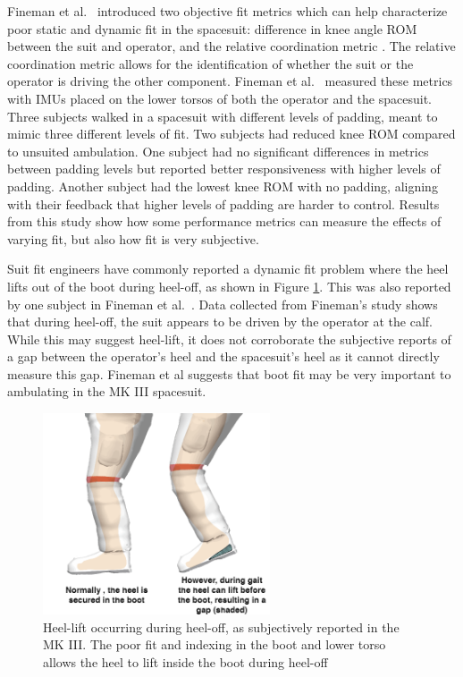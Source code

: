 \documentclass[defaultstyle,11pt]{comps}
\begin{document}
Fineman et al.~\citep{Fineman2018} introduced two objective fit metrics which can help characterize poor static and dynamic fit in the spacesuit: difference in knee angle ROM between the suit and operator, and the relative coordination metric \citep{Fineman2017a}.
The relative coordination metric allows for the identification of whether the suit or the operator is driving the other component.
Fineman et al.~\citep{Fineman2018} measured these metrics with IMUs placed on the lower torsos of both the operator and the spacesuit.
Three subjects walked in a spacesuit with different levels of padding, meant to mimic three different levels of fit.
Two subjects had reduced knee ROM compared to unsuited ambulation.
One subject had no significant differences in metrics between padding levels but reported better responsiveness with higher levels of padding.
Another subject had the lowest knee ROM with no padding, aligning with their feedback that higher levels of padding are harder to control.
Results from this study show how some performance metrics can measure the effects of varying fit, but also how fit is very subjective.

Suit fit engineers have commonly reported a dynamic fit problem where the heel lifts out of the boot during heel-off, as shown in Figure \ref{fig:B-HeelLift}.
This was also reported by one subject in Fineman et al.~\citep{Fineman2018}.
Data collected from Fineman's study shows that during heel-off, the suit appears to be driven by the operator at the calf.
While this may suggest heel-lift, it does not corroborate the subjective reports of a gap between the operator's heel and the spacesuit's heel as it cannot directly measure this gap.
Fineman et al \citep{Fineman2018} suggests that boot fit may be very important to ambulating in the MK III spacesuit.

\begin{figure}
\hypertarget{fig:B-HeelLift}{%
\centering
\includegraphics[width=0.6\textwidth,height=\textheight]{../fig/Background/HeelLift.png}
\caption{Heel-lift occurring during heel-off, as subjectively reported in the MK III. The poor fit and indexing in the boot and lower torso allows the heel to lift inside the boot during heel-off}\label{fig:B-HeelLift}
}
\end{figure}
\end{document}

